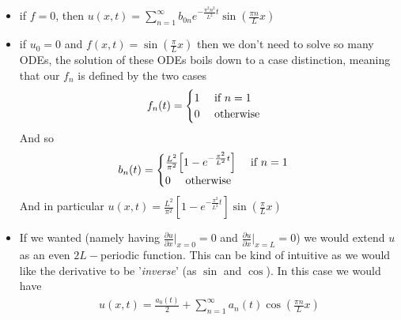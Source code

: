\begin{framedremark}
\begin{itemize}
    \item if $f = 0$, then $u\left(x, t\right) =  \sum_{n = 1}^{\infty}b_{0n}e^{-\frac{\pi^2 n^2}{L^2}t}\sin\left(\frac{\pi n }{L}x\right)$
    \item if $u_{0 }= 0$ and $f\left(x, t\right) =  \sin\left(\frac{\pi }{L}x\right)$ then we don't need to solve so many ODEs, the solution of these ODEs boils down to a case distinction, meaning that our $f_n$ is defined by the two cases 
		\begin{align*} 
			f_n\left(t\right) = \begin{cases}
				1 \mathspace \text{ if } n = 1\\
				0 \mathspace \text{ otherwise}
			\end{cases}
		\end{align*}
		And so 
		\begin{align*} 
			b_{n}\left(t\right) =  \begin{cases}
				\frac{L^2}{\pi^2}\left[1 - e^{-\frac{\pi^2}{L^2}t}\right] \mathspace \text{ if } n= 1\\
				0 \mathspace \text{ otherwise}
			\end{cases} 
		\end{align*}
		And in particular $u\left(x, t\right) = \frac{L^2}{\pi^2}\left[1 - e^{-\frac{\pi^2}{L^2}t}\right]\sin\left(\frac{\pi}{L}x\right)$
		\item If we wanted  (namely having $\frac{\partial u}{\partial x}  |_{x= 0}= 0$ and $\frac{\partial u}{\partial x} |_{x= L}= 0$) we would extend $u$ as an even $2L-$periodic function. This can be kind of intuitive as we would like the derivative to be '\textit{inverse}' (as $\sin$ and $\cos$). In this case we would have 
			\begin{align*} 
				u\left(x, t\right)= \frac{a_0\left(t\right)}{2} + \sum_{n = 1}^{\infty}a_n\left(t\right)\cos\left(\frac{\pi n}{L}x\right)
			\end{align*}
\end{itemize}

\end{framedremark}



